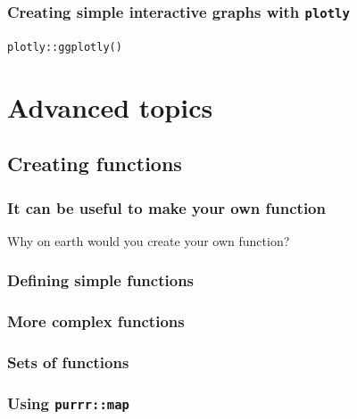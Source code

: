 \documentclass[]{book}
\begin{document}
\hypertarget{creating-simple-interactive-graphs-with-plotly}{%
\section{\texorpdfstring{Creating simple interactive graphs with \texttt{plotly}}{Creating simple interactive graphs with plotly}}\label{creating-simple-interactive-graphs-with-plotly}}

\texttt{plotly::ggplotly()}

\hypertarget{part-advanced-topics}{%
\part{Advanced topics}\label{part-advanced-topics}}

\hypertarget{creating-functions}{%
\chapter{Creating functions}\label{creating-functions}}

\hypertarget{it-can-be-useful-to-make-your-own-function}{%
\section{It can be useful to make your own function}\label{it-can-be-useful-to-make-your-own-function}}

Why on earth would you create your own function?

\hypertarget{defining-simple-functions}{%
\section{Defining simple functions}\label{defining-simple-functions}}

\hypertarget{more-complex-functions}{%
\section{More complex functions}\label{more-complex-functions}}

\hypertarget{sets-of-functions}{%
\section{Sets of functions}\label{sets-of-functions}}

\hypertarget{using-purrrmap}{%
\section{\texorpdfstring{Using \texttt{purrr::map}}{Using purrr::map}}\label{using-purrrmap}}
\end{document}
